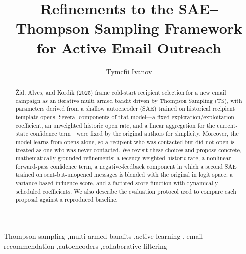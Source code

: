 \documentclass[a4paper,fleqn]{cas-dc}
\begin{document}
\let\WriteBookmarks\relax


\title[mode=title]{Refinements to the SAE--Thompson Sampling Framework for
  Active Email Outreach}

\author[1]{Tymofii Ivanov}


\begin{abstract}
\v{Z}id, Alves, and Kord\'ik (2025) frame cold-start recipient selection for a new email
campaign as an iterative multi-armed bandit driven by Thompson Sampling
(TS), with parameters derived from a shallow autoencoder (SAE) trained on
historical recipient--template opens. Several components of that model---a
fixed exploration/exploitation coefficient, an unweighted historic open
rate, and a linear aggregation for the current-state confidence term---were
fixed by the original authors for simplicity. Moreover, the model learns
from opens alone, so a recipient who was contacted but did not open is
treated as one who was never contacted. We revisit these choices and propose
concrete, mathematically grounded refinements: a recency-weighted historic
rate, a nonlinear forward-pass confidence term, a negative-feedback
component in which a second SAE trained on sent-but-unopened messages is
blended with the original in logit space, a variance-based influence score,
and a factored score function with dynamically scheduled coefficients. We
also describe the evaluation protocol used to compare
each proposal against a reproduced baseline.
\end{abstract}

\begin{keywords}
Thompson sampling \sep multi-armed bandits \sep active learning \sep
email recommendation \sep autoencoders \sep collaborative filtering
\end{keywords}

\maketitle








\end{document}
